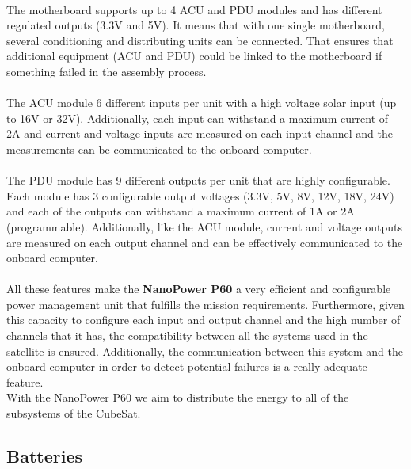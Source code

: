 \paragraph{}The motherboard supports up to 4 ACU and PDU modules and has different regulated outputs (3.3V and 5V). It means that with one single motherboard, several conditioning and distributing units can be connected. That ensures that additional equipment (ACU and PDU) could be linked to the motherboard if something failed in the assembly process.

\paragraph{}The ACU module 6 different inputs per unit with a high voltage solar input (up to 16V or 32V). Additionally, each input can withstand a maximum current of 2A and current and voltage inputs are measured on each input channel and the measurements can be communicated to the onboard computer.

\paragraph{}The PDU module has 9 different outputs per unit that are highly configurable. Each module has 3 configurable output voltages (3.3V, 5V, 8V, 12V, 18V, 24V) and each of the outputs can withstand a maximum current of 1A or 2A (programmable). Additionally, like the ACU module, current and voltage outputs are measured on each output channel and can be effectively communicated to the onboard computer.

\paragraph{}All these features make the \textbf{NanoPower P60} a very efficient and configurable power management unit that fulfills the mission requirements. Furthermore, given this capacity to configure each input and output channel and the high number of channels that it has, the compatibility between all the systems used in the satellite is ensured. Additionally, the communication between this system and the onboard computer in order to detect potential failures is a really adequate feature.\\
With the NanoPower P60 we aim to distribute the energy to all of the subsystems of the CubeSat.

\subsection{Batteries}

